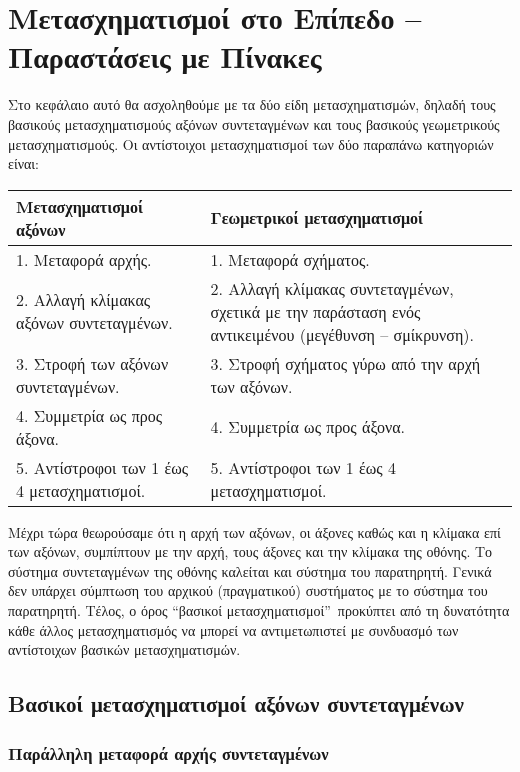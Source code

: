 \chapter{Μετασχηματισμοί στο Επίπεδο – Παραστάσεις με Πίνακες}
		
Στο κεφάλαιο αυτό θα ασχοληθούμε με τα δύο είδη μετασχηματισμών, δηλαδή τους βασικούς μετασχηματισμούς αξόνων συντεταγμένων και τους βασικούς γεωμετρικούς μετασχηματισμούς. Οι αντίστοιχοι μετασχηματισμοί των δύο παραπάνω κατηγοριών είναι:

\begin{center}
\begin{tabular}{m{}m{}}
\toprule
\textbf{Μετασχηματισμοί αξόνων} & \textbf{Γεωμετρικοί μετασχηματισμοί} \\
\midrule
1. Μεταφορά αρχής. & 1. Μεταφορά σχήματος. \\
2. Αλλαγή κλίμακας αξόνων συντεταγμένων. & 2. Αλλαγή κλίμακας συντεταγμένων, σχετικά με την παράσταση ενός αντικειμένου (μεγέθυνση – σμίκρυνση). \\
3. Στροφή των αξόνων συντεταγμένων. & 3. Στροφή σχήματος γύρω από την αρχή των αξόνων. \\
4. Συμμετρία ως προς άξονα. & 4. Συμμετρία ως προς άξονα. \\
5. Αντίστροφοι των 1 έως 4 μετασχηματισμοί. & 5. Αντίστροφοι των 1 έως 4 μετασχηματισμοί. \\
\bottomrule
\end{tabular}
\end{center}


Μέχρι τώρα θεωρούσαμε ότι η αρχή των αξόνων, οι άξονες καθώς και η κλίμακα επί των αξόνων, συμπίπτουν με την αρχή, τους άξονες και την κλίμακα της οθόνης. Το σύστημα συντεταγμένων της οθόνης καλείται και σύστημα του παρατηρητή. Γενικά δεν υπάρχει σύμπτωση του αρχικού (πραγματικού) συστήματος με το σύστημα του παρατηρητή. Τέλος, ο όρος \textquotedblleft βασικοί μετασχηματισμοί\textquotedblright\ προκύπτει από τη δυνατότητα κάθε άλλος μετασχηματισμός να μπορεί να αντιμετωπιστεί με συνδυασμό των αντίστοιχων βασικών μετασχηματισμών.

\section{Βασικοί μετασχηματισμοί αξόνων συντεταγμένων}

\subsection{Παράλληλη μεταφορά αρχής συντεταγμένων}

